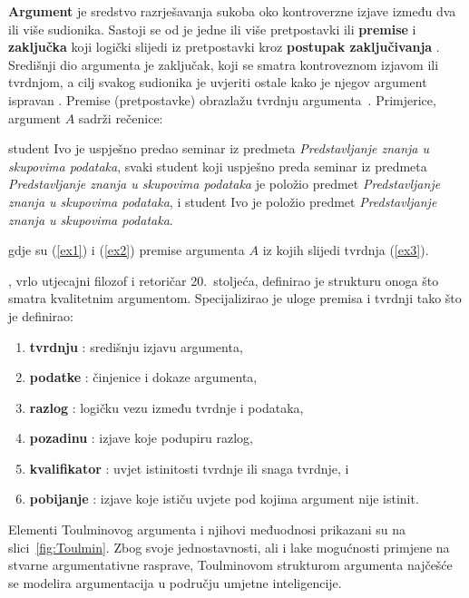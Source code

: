 \textbf{Argument} je sredstvo razrješavanja sukoba oko kontroverzne izjave 
 \citep{walton1990reasoning} između dva ili više sudionika.
Sastoji se od je jedne ili više pretpostavki ili \textbf{premise} 
i \textbf{zaključka}  koji logički slijedi iz pretpostavki kroz
\textbf{postupak zaključivanja} . 
Središnji dio argumenta je zaključak, koji se smatra
kontroveznom izjavom ili tvrdnjom, a cilj svakog sudionika je
uvjeriti ostale kako je njegov argument ispravan \citep{walton1990reasoning}. 
Premise (pretpostavke) obrazlažu   
tvrdnju argumenta~\citep{besnard2008elements}. 
Primjerice, argument $A$ sadrži rečenice: 

\begin{exe}
    \ex\label{ex1} student Ivo je uspješno predao seminar iz predmeta 
    \textit{Predstavljanje znanja u skupovima podataka},
    \ex\label{ex2} svaki student koji uspješno preda seminar iz predmeta 
    \textit{Predstavljanje znanja u skupovima podataka} je položio predmet 
    \textit{Predstavljanje znanja u skupovima podataka}, i
    \ex\label{ex3} student Ivo je položio predmet 
    \textit{Predstavljanje znanja u skupovima podataka}. 
\end{exe} 
gdje su (\ref{ex1}) i (\ref{ex2}) premise argumenta $A$ iz kojih slijedi tvrdnja (\ref{ex3}).

\cite{toulmin1974uses}, vrlo utjecajni filozof i retoričar 20.\ stoljeća, definirao je 
strukturu onoga što smatra kvalitetnim argumentom. 
Specijalizirao je uloge premisa i tvrdnji tako što je definirao: 
\begin{enumerate}
    \item \textbf{tvrdnju} : središnju izjavu argumenta,
    \item \textbf{podatke} : činjenice i dokaze argumenta,
    \item \textbf{razlog} : logičku vezu između tvrdnje i podataka,
    \item \textbf{pozadinu} : izjave koje podupiru razlog,
    \item \textbf{kvalifikator} : uvjet istinitosti tvrdnje ili snaga tvrdnje, i
    \item \textbf{pobijanje} : izjave koje ističu uvjete pod kojima argument nije istinit.
\end{enumerate}
Elementi Toulminovog argumenta i njihovi međuodnosi prikazani su na slici~\ref{fig:Toulmin}.  
 Zbog svoje jednostavnosti, ali i 
lake mogućnosti primjene na stvarne argumentativne rasprave, 
Toulminovom strukturom argumenta najčešće se
modelira argumentacija u području umjetne inteligencije.

